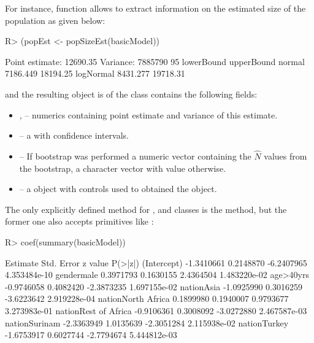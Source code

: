 \documentclass[
]{jss}
\newcommand{\1}{\mathcal{I}} \newcommand{\bZero}{\boldsymbol{0}}
\begin{document}
For instance, function  allows to extract information
on the estimated size of the population as given below:

\begin{CodeChunk}
\begin{CodeInput}
R> (popEst <- popSizeEst(basicModel))
\end{CodeInput}
\begin{CodeOutput}
Point estimate: 12690.35
Variance: 7885790
95%
          lowerBound upperBound
normal      7186.449   18194.25
logNormal   8431.277   19718.31
\end{CodeOutput}
\end{CodeChunk}

and the resulting object  is of the
 class contains the following fields:

\begin{itemize}
  \item {},  -- numerics containing point estimate and variance of this estimate.
  \item {} -- a  with confidence intervals.
  \item {} -- If bootstrap was performed a numeric vector containing the $\hat{N}$ values from the bootstrap, 
  a character vector with value  otherwise.
  \item {} -- a  object with controls used to obtained the object.
\end{itemize}

The only explicitly defined method for ,
 and 
classes is the  method, but the former one also accepts
 primitives like :

\begin{CodeChunk}
\begin{CodeInput}
R> coef(summary(basicModel))
\end{CodeInput}
\begin{CodeOutput}
                       Estimate Std. Error    z value      P(>|z|)
(Intercept)          -1.3410661  0.2148870 -6.2407965 4.353484e-10
gendermale            0.3971793  0.1630155  2.4364504 1.483220e-02
age>40yrs            -0.9746058  0.4082420 -2.3873235 1.697155e-02
nationAsia           -1.0925990  0.3016259 -3.6223642 2.919228e-04
nationNorth Africa    0.1899980  0.1940007  0.9793677 3.273983e-01
nationRest of Africa -0.9106361  0.3008092 -3.0272880 2.467587e-03
nationSurinam        -2.3363949  1.0135639 -2.3051284 2.115938e-02
nationTurkey         -1.6753917  0.6027744 -2.7794674 5.444812e-03
\end{CodeOutput}
\end{CodeChunk}
\end{document}
